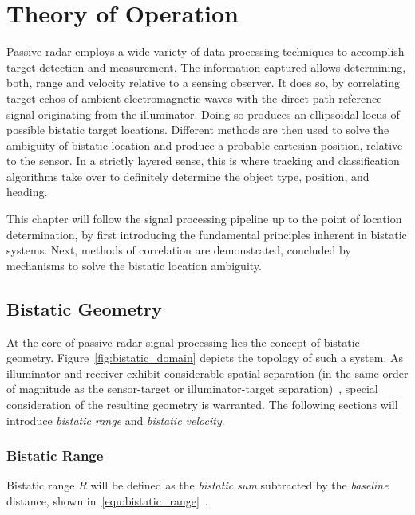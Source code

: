 \chapter{Theory of Operation}\label{chp:theory_of_operation}

Passive radar employs a wide variety of data processing techniques to accomplish target detection and measurement. The information captured allows determining, both, range and velocity relative to a sensing observer. It does so, by correlating target echos of ambient electromagnetic waves with the direct path reference signal originating from the illuminator. Doing so produces an ellipsoidal locus of possible bistatic target locations. Different methods are then used to solve the ambiguity of bistatic location and produce a probable cartesian position, relative to the sensor. In a strictly layered sense, this is where tracking and classification algorithms take over to definitely determine the object type, position, and heading.

This chapter will follow the signal processing pipeline up to the point of location determination, by first introducing the fundamental principles inherent in bistatic systems. Next, methods of correlation are demonstrated, concluded by mechanisms to solve the bistatic location ambiguity.

\section{Bistatic Geometry}\label{sct:bistatic_geometry}

At the core of passive radar signal processing lies the concept of bistatic geometry. Figure~\ref{fig:bistatic_domain} depicts the topology of such a system. As illuminator and receiver exhibit considerable spatial separation (in the same order of magnitude as the sensor-target or illuminator-target separation)~\cite[p.~1571]{Griffiths2010}, special consideration of the resulting geometry is warranted. The following sections will introduce \emph{bistatic range} and \emph{bistatic velocity}.

\subsection{Bistatic Range}

Bistatic range \(R\) will be defined as the \emph{bistatic sum} subtracted by the \emph{baseline} distance, shown in~\ref{equ:bistatic_range}~\cite[p.~10]{Malanowski2019}.


